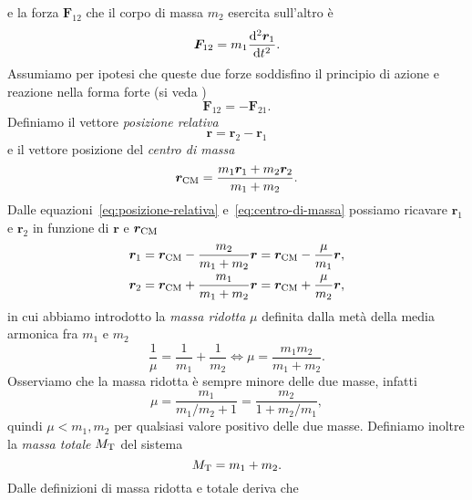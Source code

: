 e la forza $\bm{F}_{12}$ che il corpo di massa $m_2$ esercita sull'altro è
\begin{equation}
  \label{eq:f12}
  \bm{F}_{12} = m_1\toder[2]{\bm{r}_1}{t}.
\end{equation}
Assumiamo per ipotesi che queste due forze soddisfino il principio di azione e
reazione nella forma forte (si veda \textcite[6]{goldstein:meccanica})
\begin{equation}
  \label{eq:azione-reazione}
  \bm{F}_{12} = -\bm{F}_{21}.
\end{equation}
Definiamo il vettore \emph{posizione relativa}
\begin{equation}
  \label{eq:posizione-relativa}
  \bm{r}=\bm{r}_2-\bm{r}_1
\end{equation}
e il vettore posizione del \emph{centro di massa}
\begin{equation}
  \label{eq:centro-di-massa}
  \bm{r}_\textup{CM} = \frac{m_1\bm{r}_1+m_2\bm{r}_2}{m_1+m_2}.
\end{equation}
Dalle equazioni~\eqref{eq:posizione-relativa} e~\eqref{eq:centro-di-massa}
possiamo ricavare $\bm{r}_1$ e $\bm{r}_2$ in funzione di $\bm{r}$ e
$\bm{r}_\textup{CM}$
\begin{subequations}
  \label{eq:r1-r2-posizione-relativa-cdm}
  \begin{align}
    \bm{r}_1 &= \bm{r}_\textup{CM} - \frac{m_2}{m_1+m_2}\bm{r} =
    \bm{r}_\textup{CM} - \frac{\mu}{m_1}\bm{r},\\
    \bm{r}_2 &= \bm{r}_\textup{CM} + \frac{m_1}{m_1+m_2}\bm{r} =
    \bm{r}_\textup{CM} + \frac{\mu}{m_2}\bm{r},
  \end{align}
\end{subequations}
in cui abbiamo introdotto la \emph{massa ridotta} $\mu$ definita dalla metà
della media armonica fra $m_1$ e $m_2$
\begin{equation}
  \frac{1}{\mu} = \frac{1}{m_1} + \frac{1}{m_2} \iff \mu=\frac{m_1m_2}{m_1+m_2}.
\end{equation}
Osserviamo che la massa ridotta è sempre minore delle due masse, infatti
\begin{equation}
  \mu =\frac{m_1}{m_1/m_2+1} = \frac{m_2}{1+m_2/m_1},
\end{equation}
quindi $\mu < m_1,m_2$ per qualsiasi valore positivo delle due masse. Definiamo
inoltre la \emph{massa totale} $M_\textup{T}$ del sistema
\begin{equation}
  M_\textup{T}=m_1+m_2.
\end{equation}
Dalle definizioni di massa ridotta e totale deriva che
